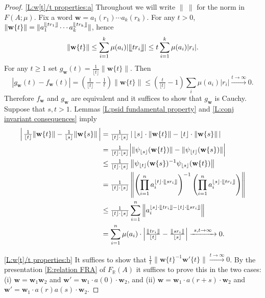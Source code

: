 \documentclass[12pt]{amsart}
\theoremstyle{definition}
\def\RR{\ensuremath{\mathbb{R}}}
\newcommand{\B}[1]{\mathbf{#1}}
\newcommand{\xto}[1]{\xrightarrow{#1}}
\newcommand{\trc}[1]{\{ #1 \}}   %
\def\Free{F}
\newcommand{\myfloor}[1]{\llfloor #1 \rrfloor}
\begin{document}
\begin{proof}
\ref{L:w[t]/t properties:a}
Throughout we will write $\| \ \|$ for the norm in $\Free(A;\mu)$.
Fix a word $\B w=a_1(r_1) \cdots a_k(r_k)$.
For any $t>0$, $\| \B w\trc{t}\| = \| a_1^{\myfloor{tr_1}} \cdots a_k^{\myfloor{tr_k}}\|$, hence
\[
\| \B w\trc{t}\| \leq \sum_{i=1}^k \mu(a_i) |\myfloor{tr_i}|
\leq
t \sum_{i=1}^k \mu(a_i) |r_i|.
\]
For any $t \geq 1$ set $g_{\B w}(t)=\tfrac{1}{\lfloor t \rfloor} \| \B w\trc{t}\|$.
Then
\[
|g_{\B w}(t)-f_{\B w}(t)| = (\tfrac{1}{\lfloor t \rfloor}-\tfrac{1}{t}) \|\B w\trc{t}\| 
\leq
(\tfrac{t}{\lfloor t \rfloor}-1) \sum_i \mu(a_i)|r_i| \xto{t \to \infty} 0.
\]
Therefore $f_{\B w}$ and $g_{\B w}$ are equivalent and it suffices to show that $g_{\B w}$ is Cauchy.
Suppose that $s,t>1$.
Lemmas \ref{L:psid fundamental property} and \ref{L:conj invariant consequences} imply 
\begin{align*}
\left| \, \tfrac{1}{\lfloor t \rfloor} \| \B w\trc{t}\| - \tfrac{1}{\lfloor s \rfloor} \| \B w\trc{s} \| \, \right| &= 
\tfrac{1}{\lfloor t \rfloor \cdot\lfloor s \rfloor } \left| \, \lfloor s \rfloor \cdot \| \B w\trc{t}\| - \lfloor t \rfloor \cdot \| \B w\trc{s}\| \, \right|\\ 
&=
\tfrac{1}{\lfloor t \rfloor \cdot\lfloor s \rfloor } \Big| \|\psi_{\lfloor s \rfloor}( \B w\trc{t})\| - \| \psi_{\lfloor t \rfloor}(\B w\trc{s})\| \Big|\\
&\leq
\tfrac{1}{\lfloor t \rfloor \cdot\lfloor s \rfloor } \left\| \psi_{\lfloor t \rfloor}(\B w\trc{s})^{-1} \psi_{\lfloor s \rfloor}( \B w\trc{t}) \right\|\\
&=
\tfrac{1}{\lfloor t \rfloor \cdot\lfloor s \rfloor } \left\| \left(\prod_{i=1}^n a_i^{\lfloor t \rfloor \cdot \myfloor{sr_i}}\right)^{-1} \left(\prod_{i=1}^n a_i^{\lfloor s \rfloor \cdot \myfloor{tr_i}}\right)\right\|\\ 
&\leq
\tfrac{1}{\lfloor t \rfloor \cdot\lfloor s \rfloor } \sum_{i=1}^n \left\| a_i^{\lfloor s \rfloor \cdot \myfloor{tr_i} -\lfloor t \rfloor \cdot \myfloor{sr_i}} \right\| \\
&=
\sum_{i=1}^n \mu(a_i) \cdot \left| \tfrac{\myfloor{tr_i}}{\lfloor t \rfloor} - \tfrac{\myfloor{sr_i}}{\lfloor s \rfloor} \right| \xto{ \ s,t \to \infty \ } 0.
\end{align*}

\noindent
\ref{L:w[t]/t properties:b}
It suffices to show that $\tfrac{1}{t} \| \B w\trc{t}^{-1} \B w'\trc{t}\| \xto{t \to \infty} 0$.
By the presentation \eqref{E:relation FRA} of $\Free_\RR(A)$ it suffices to prove this in the two cases: (i) $\B w=\B w_1 \B w_2$ and $\B w'=\B w_1 \cdot a(0) \cdot \B w_2$,
and (ii) $\B w=\B w_1 \cdot a(r+s) \cdot \B w_2$ and $\B w'=\B w_1 \cdot a(r) a(s) \cdot \B w_2$.


\end{proof}
\end{document}
